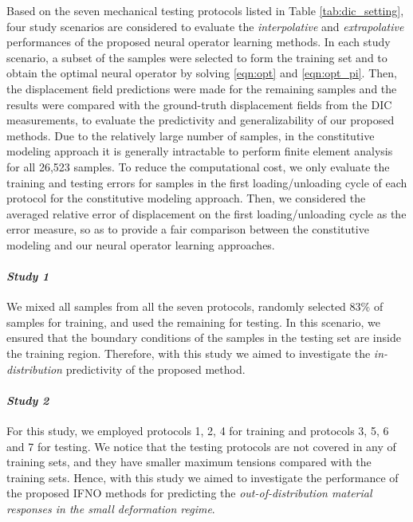 \documentclass[twocolumn,10pt]{asme2ej}
\renewcommand{\~}{\tilde}
\renewcommand{\-}{\bar}
\newcommand{\8}{\infty}
\numberwithin{equation}{section}
\begin{document}
Based on the seven mechanical testing protocols listed in Table \ref{tab:dic_setting}, four study scenarios are considered to evaluate the \textit{interpolative} and \textit{extrapolative} performances of the proposed neural operator learning methods. In each study scenario, a subset of the samples were selected to form the training set and to obtain the optimal neural operator by solving \eqref{eqn:opt} and \eqref{eqn:opt_pi}. Then, the displacement field predictions were made for the remaining samples and the results were compared with the ground-truth displacement fields from the DIC measurements, to evaluate the predictivity and generalizability of our proposed methods.  Due to the relatively large number of samples, in the constitutive modeling approach it is generally intractable to perform finite element analysis for all 26,523 samples. To reduce the computational cost, we only evaluate the training and testing errors for samples in the first loading/unloading cycle of each protocol for the constitutive modeling approach. Then, we considered the averaged relative error of displacement on the first loading/unloading cycle as the error measure, so as to provide a fair comparison between the constitutive modeling and our neural operator learning approaches.




\paragraph{\textit{Study 1}} We mixed all samples from all the seven protocols, randomly selected $83\%$ of samples for training, and used the remaining for testing. In this scenario, we ensured that the boundary conditions of the samples in the testing set are inside the training region. Therefore, with this study we aimed to investigate the \textit{in-distribution} predictivity of the proposed method.

\paragraph{\textit{Study 2}} For this study, %
we employed protocols 1, 2, 4 for training and protocols 3, 5, 6 and 7 for testing.
We notice that the testing protocols are not covered in any of training sets, and they have smaller maximum tensions compared with the training sets. Hence, with this study we aimed to investigate the performance of the proposed IFNO methods for predicting the \textit{out-of-distribution material responses in the small deformation regime}. 
\end{document}
